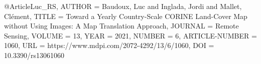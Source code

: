 @Article{Luc_RS,
AUTHOR = {Baudoux, Luc and Inglada, Jordi and Mallet, Clément},
TITLE = {Toward a Yearly Country-Scale CORINE Land-Cover Map without Using Images: A Map Translation Approach},
JOURNAL = {Remote Sensing},
VOLUME = {13},
YEAR = {2021},
NUMBER = {6},
ARTICLE-NUMBER = {1060},
URL = {https://www.mdpi.com/2072-4292/13/6/1060},
DOI = {10.3390/rs13061060}
}



